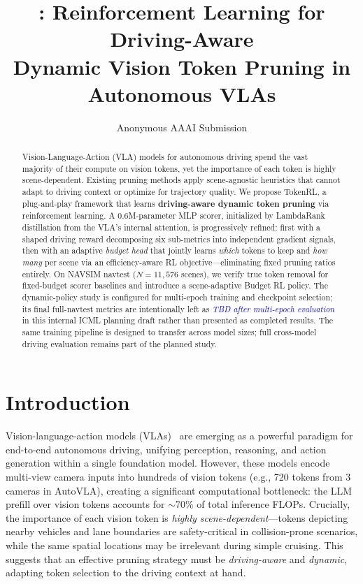 \documentclass[letterpaper]{article} %
\title{\ours{}: Reinforcement Learning for Driving-Aware\\Dynamic Vision Token Pruning in Autonomous VLAs}
\author{
    Anonymous AAAI Submission
}
\newcommand{\ours}{TokenRL}
\newcommand{\pending}{\textcolor{blue}{\textit{TBD after multi-epoch evaluation}}}
\begin{document}
\maketitle

\begin{abstract}
Vision-Language-Action (VLA) models for autonomous driving spend the vast majority of their compute on vision tokens, yet the importance of each token is highly scene-dependent.
Existing pruning methods apply scene-agnostic heuristics that cannot adapt to driving context or optimize for trajectory quality.
We propose \ours{}, a plug-and-play framework that learns \textbf{driving-aware dynamic token pruning} via reinforcement learning.
A 0.6M-parameter MLP scorer, initialized by LambdaRank distillation from the VLA's internal attention, is progressively refined: first with a shaped driving reward decomposing six sub-metrics into independent gradient signals, then with an adaptive \emph{budget head} that jointly learns \emph{which} tokens to keep and \emph{how many} per scene via an efficiency-aware RL objective---eliminating fixed pruning ratios entirely.
On NAVSIM navtest ($N{=}11{,}576$ scenes), we verify true token removal for fixed-budget scorer baselines and introduce a scene-adaptive Budget RL policy. The dynamic-policy study is configured for multi-epoch training and checkpoint selection; its final full-navtest metrics are intentionally left as \pending{} in this internal ICML planning draft rather than presented as completed results.
The same training pipeline is designed to transfer across model sizes; full cross-model driving evaluation remains part of the planned study.
\end{abstract}

\section{Introduction}
\label{sec:intro}

Vision-language-action models (VLAs)~\citep{autovla2025} are emerging as a powerful paradigm for end-to-end autonomous driving, unifying perception, reasoning, and action generation within a single foundation model.
However, these models encode multi-view camera inputs into hundreds of vision tokens (e.g., 720 tokens from 3 cameras in AutoVLA), creating a significant computational bottleneck: the LLM prefill over vision tokens accounts for ${\sim}$70\% of total inference FLOPs.
Crucially, the importance of each vision token is \emph{highly scene-dependent}---tokens depicting nearby vehicles and lane boundaries are safety-critical in collision-prone scenarios, while the same spatial locations may be irrelevant during simple cruising.
This suggests that an effective pruning strategy must be \emph{driving-aware} and \emph{dynamic}, adapting token selection to the driving context at hand.
\end{document}
